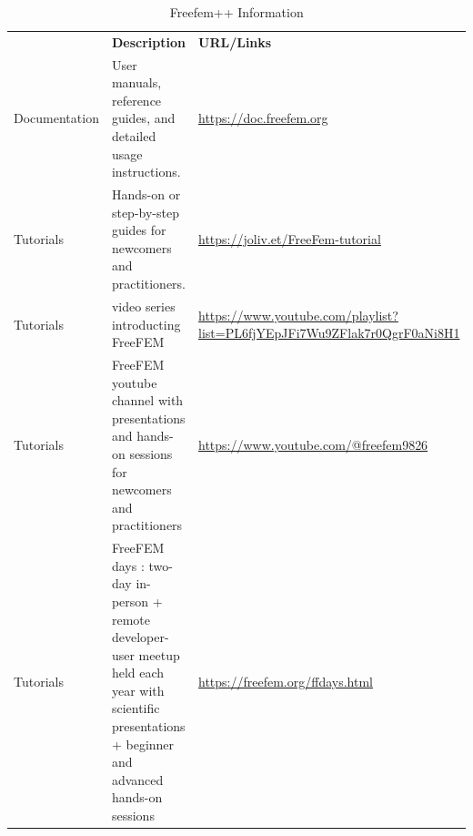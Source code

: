 \begin{table}[H]
{{%
    {
    \setlength{\parindent}{0pt}
    \def\arraystretch{1.25}
    {\fontsize{9}{11}\selectfont
    \begin{tabular}{!{\color{numpexgray}\vrule}p{0.20\textwidth}
                    !{\color{numpexgray}\vrule}p{0.40\textwidth}
                    !{\color{numpexgray}\vrule}p{0.35\textwidth}
                    !{\color{numpexgray}\vrule}}
         & {\rule{0pt}{2.5ex}\color{white}\bf Description} 
         & {\rule{0pt}{2.5ex}\color{white}\bf URL/Links} \\
Documentation & User manuals, reference guides, and detailed usage instructions. & \url{https://doc.freefem.org} \\
Tutorials & Hands-on or step-by-step guides for newcomers and practitioners. & \url{https://joliv.et/FreeFem-tutorial} \\
Tutorials & video series introducting FreeFEM & \url{https://www.youtube.com/playlist?list=PL6fjYEpJFi7Wu9ZFlak7r0QgrF0aNi8H1} \\
Tutorials & FreeFEM youtube channel with presentations and hands-on sessions for newcomers and practitioners & \url{https://www.youtube.com/@freefem9826} \\
Tutorials & FreeFEM days : two-day in-person + remote developer-user meetup held each year with scientific presentations + beginner and advanced hands-on sessions & \url{https://freefem.org/ffdays.html} \\

\bottomrule
    \end{tabular}
    }}

    }}
    \caption{Freefem++ Information}
\end{table}



